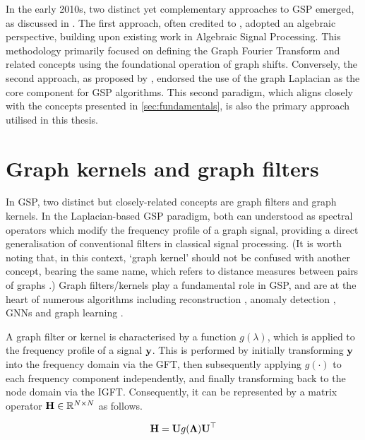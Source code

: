 In the early 2010s, two distinct yet complementary approaches to GSP emerged, as discussed in \cite{Leus2023}. The first approach, often credited to \cite{Sandryhaila2013,Sandryhaila2013b}, adopted an algebraic perspective, building upon existing work in Algebraic Signal Processing. This methodology primarily focused on defining the Graph Fourier Transform and related concepts using the foundational operation of graph shifts. Conversely, the second approach, as proposed by  \cite{Hammond2011,Shuman2013}, endorsed the use of the graph Laplacian as the core component for GSP algorithms. This second paradigm, which aligns closely with the concepts presented in \cref{sec:fundamentals}, is also the primary approach utilised in this thesis.


\section{Graph kernels and graph filters}

\label{sec:graph_kernels}

In GSP, two distinct but closely-related concepts are graph filters and graph kernels. In the Laplacian-based GSP paradigm, both can understood as spectral operators which modify the frequency profile of a graph signal, providing a direct generalisation of conventional filters in classical signal processing. (It is worth noting that, in this context, `graph kernel' should not be confused with another concept, bearing the same name, which refers to distance measures between pairs of graphs \citep{Kriege2020}.) Graph filters/kernels play a fundamental role in GSP, and are at the heart of numerous algorithms including reconstruction \citep{Romero2017b}, anomaly detection \citep{Xiao2021}, GNNs \citep{Gama2020} and graph learning \citep{Mateos2019}. 

A graph filter or kernel is characterised by a function $g(\lambda)$, which is applied to the frequency profile of a signal $\mathbf{y}$. This is performed by initially transforming $\mathbf{y}$ into the frequency domain via the GFT, then subsequently applying $g(\cdot)$ to each frequency component independently, and finally transforming back to the node domain via the IGFT. Consequently, it can be represented by a matrix operator $\mathbf{H} \in \mathbb{R}^{N \times N}$ as follows.

\begin{equation}
    \mathbf{H}  = \mathbf{U} g(\mathbf{\Lambda}) \mathbf{U}^\top 
\end{equation}


